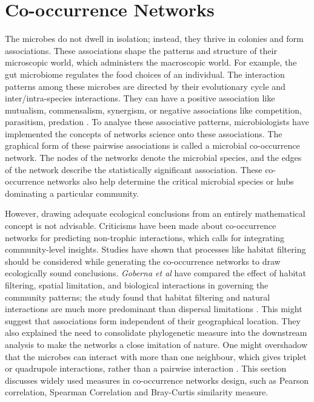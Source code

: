 \chapter{Co-occurrence Networks}
 \setcounter{page}{18}

The microbes do not dwell in isolation; instead, they thrive in colonies and form associations. These associations shape the patterns and structure of their microscopic world, which administers the macroscopic world. For example, the gut microbiome regulates the food choices of an individual. The interaction patterns among these microbes are directed by their evolutionary cycle and inter/intra-species interactions. They can have a positive association like mutualism, commensalism, synergism, or negative associations like competition, parasitism, predation \cite{weiss_2016_correlation}. To analyse these associative patterns, microbiologists have implemented the concepts of networks science onto these associations. The graphical form of these pairwise associations is called a microbial co-occurrence network. The nodes of the networks denote the microbial species, and the edges of the network describe the statistically significant association. These co-occurrence networks also help determine the critical microbial species or hubs dominating a particular community.\newline

However, drawing adequate ecological conclusions from an entirely mathematical concept is not advisable. Criticisms have been made about co-occurrence networks for predicting non-trophic interactions, which calls for integrating community-level insights. Studies have shown that processes like habitat filtering should be considered while generating the co-occurrence networks to draw ecologically sound conclusions. \emph{Goberna et al} have compared the effect of habitat filtering, spatial limitation, and biological interactions in governing the community patterns; the study found that habitat filtering and natural interactions are much more predominant than dispersal limitations \cite{ref10}. This might suggest that associations form independent of their geographical location. They also explained the need to consolidate phylogenetic measure into the downstream analysis to make the networks a close imitation of nature. One might overshadow that the microbes can interact with more than one neighbour, which gives triplet or quadrupole interactions, rather than a pairwise interaction \cite{berry_2014_deciphering}. This section discusses widely used measures in co-occurrence networks design, such as Pearson correlation, Spearman Correlation and Bray-Curtis similarity measure.

